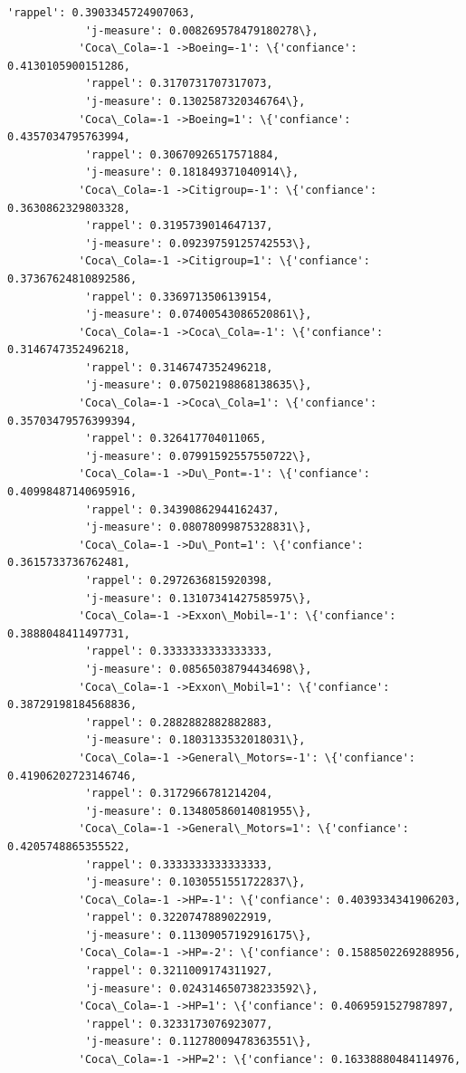 \documentclass[11pt]{article}
\begin{document}
\begin{Verbatim}[commandchars=\\\{\}]
            'rappel': 0.3903345724907063,
            'j-measure': 0.008269578479180278\},
           'Coca\_Cola=-1 ->Boeing=-1': \{'confiance': 0.4130105900151286,
            'rappel': 0.3170731707317073,
            'j-measure': 0.1302587320346764\},
           'Coca\_Cola=-1 ->Boeing=1': \{'confiance': 0.4357034795763994,
            'rappel': 0.30670926517571884,
            'j-measure': 0.181849371040914\},
           'Coca\_Cola=-1 ->Citigroup=-1': \{'confiance': 0.3630862329803328,
            'rappel': 0.3195739014647137,
            'j-measure': 0.09239759125742553\},
           'Coca\_Cola=-1 ->Citigroup=1': \{'confiance': 0.37367624810892586,
            'rappel': 0.3369713506139154,
            'j-measure': 0.07400543086520861\},
           'Coca\_Cola=-1 ->Coca\_Cola=-1': \{'confiance': 0.3146747352496218,
            'rappel': 0.3146747352496218,
            'j-measure': 0.07502198868138635\},
           'Coca\_Cola=-1 ->Coca\_Cola=1': \{'confiance': 0.35703479576399394,
            'rappel': 0.326417704011065,
            'j-measure': 0.07991592557550722\},
           'Coca\_Cola=-1 ->Du\_Pont=-1': \{'confiance': 0.40998487140695916,
            'rappel': 0.34390862944162437,
            'j-measure': 0.08078099875328831\},
           'Coca\_Cola=-1 ->Du\_Pont=1': \{'confiance': 0.3615733736762481,
            'rappel': 0.2972636815920398,
            'j-measure': 0.13107341427585975\},
           'Coca\_Cola=-1 ->Exxon\_Mobil=-1': \{'confiance': 0.3888048411497731,
            'rappel': 0.3333333333333333,
            'j-measure': 0.08565038794434698\},
           'Coca\_Cola=-1 ->Exxon\_Mobil=1': \{'confiance': 0.38729198184568836,
            'rappel': 0.2882882882882883,
            'j-measure': 0.1803133532018031\},
           'Coca\_Cola=-1 ->General\_Motors=-1': \{'confiance': 0.41906202723146746,
            'rappel': 0.3172966781214204,
            'j-measure': 0.13480586014081955\},
           'Coca\_Cola=-1 ->General\_Motors=1': \{'confiance': 0.4205748865355522,
            'rappel': 0.3333333333333333,
            'j-measure': 0.1030551551722837\},
           'Coca\_Cola=-1 ->HP=-1': \{'confiance': 0.4039334341906203,
            'rappel': 0.3220747889022919,
            'j-measure': 0.11309057192916175\},
           'Coca\_Cola=-1 ->HP=-2': \{'confiance': 0.1588502269288956,
            'rappel': 0.3211009174311927,
            'j-measure': 0.024314650738233592\},
           'Coca\_Cola=-1 ->HP=1': \{'confiance': 0.4069591527987897,
            'rappel': 0.3233173076923077,
            'j-measure': 0.11278009478363551\},
           'Coca\_Cola=-1 ->HP=2': \{'confiance': 0.16338880484114976,

\end{Verbatim}
\end{document}
